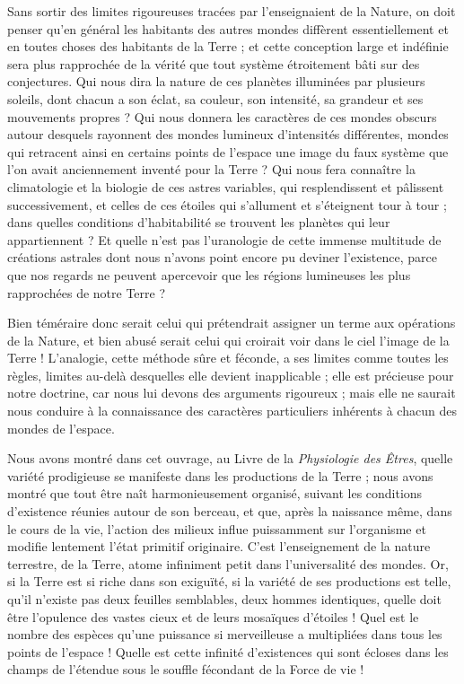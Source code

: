 \documentclass[a4paper, 11pt, oneside, landscape]{article}
\begin{document}
Sans sortir des limites rigoureuses tracées par l'enseignaient de la Nature, on doit penser qu'en général les habitants des autres mondes diffèrent essentiellement et en toutes choses des habitants de la Terre ; et cette conception large et indéfinie sera plus rapprochée de la vérité que tout système étroitement bâti sur des conjectures. Qui nous dira la nature de ces planètes illuminées par plusieurs soleils, dont chacun a son éclat, sa couleur, son intensité, sa grandeur et ses mouvements propres ? Qui nous donnera les caractères de ces mondes obscurs autour desquels rayonnent des mondes lumineux d'intensités différentes, mondes qui retracent ainsi en certains points de l'espace une image du faux système que l'on avait anciennement inventé pour la Terre ? Qui nous fera connaître la climatologie et la biologie de ces astres variables, qui resplendissent et pâlissent successivement, et celles de ces étoiles qui s'allument et s'éteignent tour à tour ; dans quelles conditions d'habitabilité se trouvent les planètes qui leur appartiennent ? Et quelle n'est pas l'uranologie de cette immense multitude de créations astrales dont nous n'avons point encore pu deviner l'existence, parce que nos regards ne peuvent apercevoir que les régions lumineuses les plus rapprochées de notre Terre ?

Bien téméraire donc serait celui qui prétendrait assigner un terme aux opérations de la Nature, et bien abusé serait celui qui croirait voir dans le ciel l'image de la Terre ! L'analogie, cette méthode sûre et féconde, a ses limites comme toutes les règles, limites au-delà desquelles elle devient inapplicable ; elle est précieuse pour notre doctrine, car nous lui devons des arguments rigoureux ; mais elle ne saurait nous conduire à la connaissance des caractères particuliers inhérents à chacun des mondes de l'espace.

Nous avons montré dans cet ouvrage, au Livre de la \emph{Physiologie des Êtres}, quelle variété prodigieuse se manifeste dans les productions de la Terre ; nous avons montré que tout être naît harmonieusement organisé, suivant les conditions d'existence réunies autour de son berceau, et que, après la naissance même, dans le cours de la vie, l'action des milieux influe puissamment sur l'organisme et modifie lentement l'état primitif originaire. C'est l'enseignement de la nature terrestre, de la Terre, atome infiniment petit dans l'universalité des mondes. Or, si la Terre est si riche dans son exiguïté, si la variété de ses productions est telle, qu'il n'existe pas deux feuilles semblables, deux hommes identiques, quelle doit être l'opulence des vastes cieux et de leurs mosaïques d'étoiles ! Quel est le nombre des espèces qu'une puissance si merveilleuse a multipliées dans tous les points de l'espace ! Quelle est cette infinité d'existences qui sont écloses dans les champs de l'étendue sous le souffle fécondant de la Force de vie !
\end{document}
